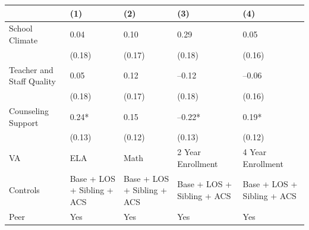 \begin{table}[tbp] \centering
{}

{\footnotesize
\begin{tabularx}{\linewidth}{lCCCC}

\toprule
&{(1)}&{(2)}&{(3)}&{(4)} \tabularnewline
\midrule \addlinespace[\belowrulesep]
School Climate&0.04&0.10&0.29&0.05 \tabularnewline
&(0.18)&(0.17)&(0.18)&(0.16) \tabularnewline
Teacher and Staff Quality&0.05&0.12&--0.12&--0.06 \tabularnewline
&(0.18)&(0.17)&(0.18)&(0.16) \tabularnewline
Counseling Support&0.24*&0.15&--0.22*&0.19* \tabularnewline
&(0.13)&(0.12)&(0.13)&(0.12) \tabularnewline
\midrule VA&ELA&Math&2 Year Enrollment&4 Year Enrollment \tabularnewline
Controls&Base + LOS + Sibling + ACS&Base + LOS + Sibling + ACS&Base + LOS + Sibling + ACS&Base + LOS + Sibling + ACS \tabularnewline
Peer&Yes&Yes&Yes&Yes \tabularnewline
\bottomrule 

\end{tabularx}
}
\end{table}
